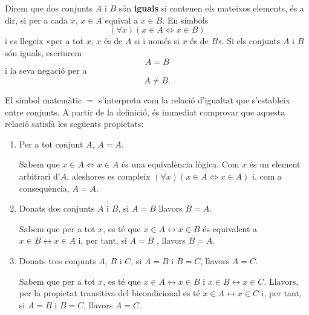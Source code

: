 Direm que dos conjunts $A$ i $B$ són \textbf{iguals} si contenen els
mateixos elements, és a dir, si per a cada $x$, $x\in A$ equival a $x\in
B$. En símbols
\begin{equation*}
\left( \forall x\right) \left( x\in A\Longleftrightarrow x\in B\right)
\end{equation*}
i es llegeix «per a tot $x$, $x$ és de $A$ si i només si $x$ és de $B$». Si els conjunts $A$ i $B$ són
iguals, escriurem%
\begin{equation*}
A=B
\end{equation*}
i la seva negació per a%
\begin{equation*}
A\neq B\text{.}
\end{equation*}

El símbol matemàtic $=$ s'interpreta com la relació d'igualtat
que s'estableix entre conjunts. A partir de la definició, és
immediat comprovar que aquesta relació satisfà les següents
propietats:

\begin{enumerate}
\item Per a tot conjunt $A$, $A=A$.

\begin{prova}
Sabem que $x\in A\Longleftrightarrow x\in A$ és una equivalència lògica. Com $x$ és un element arbitrari d'$A$, aleshores es compleix $%
\left( \forall x\right) \left( x\in A\Longleftrightarrow x\in A\right) $ i,
com a consequència, $A=A$.
\end{prova}

\item Donats dos conjunts $A$ i $B$, si $A=B$ llavors $B=A$.

\begin{prova}
Sabem que per a tot $x$, es té que $x\in A\longleftrightarrow x\in B$
és equivalent a $x\in B\longleftrightarrow x\in A$ i, per tant, si $A=B$%
, llavors $B=A$.
\end{prova}

\item Donats tres conjunts $A$, $B$ i $C$, si $A=B$ i $B=C$, llavors $A=C$.

\begin{prova}
Sabem que per a tot $x$, es té que $x\in A\longleftrightarrow x\in B$ i $
x\in B\longleftrightarrow x\in C$. Llavors, per la propietat transitiva del
bicondicional es té $x\in A\longleftrightarrow x\in C$ i, per tant, si $%
A=B$ i $B=C$, llavors $A=C$.
\end{prova}
\end{enumerate}

